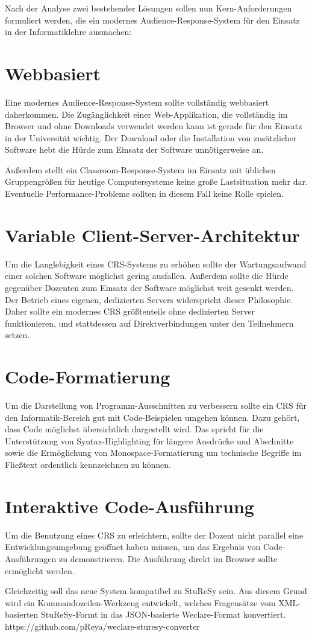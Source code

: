 Nach der Analyse zwei bestehender Lösungen sollen nun Kern-Anforderungen formuliert werden, die ein modernes Audience-Response-System für den Einsatz in der Informatiklehre ausmachen:

\section{Webbasiert}
\label{chap:webbasiert}
Eine modernes Audience-Response-System sollte vollständig webbasiert daherkommen. Die Zugänglichkeit einer Web-Applikation, die vollständig im Browser und ohne Downloads verwendet werden kann ist gerade für den Einsatz in der Universität wichtig. Der Download oder die Installation von zusätzlicher Software hebt die Hürde zum Einsatz der Software unnötigerweise an.

Außerdem stellt ein Classroom-Response-System im Einsatz mit üblichen Gruppengrößen für heutige Computersysteme keine große Lastsituation mehr dar. Eventuelle Performance-Probleme sollten in diesem Fall keine Rolle spielen.

\section{Variable Client-Server-Architektur}
\label{chap:p2p}
Um die Langlebigkeit eines CRS-Systems zu erhöhen sollte der Wartungsaufwand einer solchen Software möglichst gering ausfallen. Außerdem sollte die Hürde gegenüber Dozenten zum Einsatz der Software möglichst weit gesenkt werden. Der Betrieb eines eigenen, dedizierten Servers widerspricht dieser Philosophie. Daher sollte ein modernes CRS größtenteils ohne dedizierten Server funktionieren, und stattdessen auf Direktverbindungen unter den Teilnehmern setzen.

\section{Code-Formatierung}
\label{chap:codeformatierung}
Um die Darstellung von Programm-Ausschnitten zu verbessern sollte ein CRS für den Informatik-Bereich gut mit Code-Beispielen umgehen können. Dazu gehört, dass Code möglichst übersichtlich dargestellt wird. Das spricht für die Unterstützung von Syntax-Highlighting für längere Ausdrücke und Abschnitte sowie die Ermöglichung von Monospace-Formatierung um technische Begriffe im Fließtext ordentlich kennzeichnen zu können.

\section{Interaktive Code-Ausführung}
\label{chap:codeausfuehrung}
Um die Benutzung eines CRS zu erleichtern, sollte der Dozent nicht parallel eine Entwicklungsumgebung geöffnet haben müssen, um das Ergebnis von Code-Ausführungen zu demonstrieren. Die Ausführung direkt im Browser sollte ermöglicht werden.

Gleichzeitig soll das neue System kompatibel zu StuReSy sein. Aus diesem Grund wird ein Kommandozeilen-Werkzeug entwickelt, welches Fragensätze vom XML-basierten StuReSy-Formt in das JSON-basierte Weclare-Format konvertiert. https://github.com/pReya/weclare-sturesy-converter
